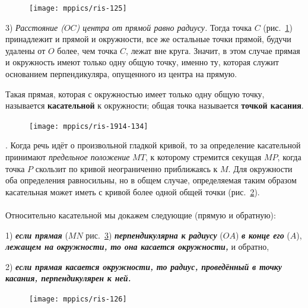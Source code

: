\documentclass[oneside]{book}
\makeatletter
\newcommand{\rindex}[2][\imki@jobname]{%
  \index[#1]{\detokenize{#2}}%
}
\makeatother
\begin{document}
\begin{figure}
\centering
\texttt{[image: mppics/ris-125]}
\caption{}\label{1938/ris-125}
\end{figure}

3) \emph{Расстояние \emph{($OC$)} центра от прямой равно радиусу.}
Тогда точка $C$ (рис.~\ref{1938/ris-125}) принадлежит и прямой и окружности, все же остальные точки прямой, будучи удалены от $O$ более, чем точка $C$, лежат вне круга.
Значит, в этом случае прямая и окружность имеют только одну общую точку, именно ту, которая служит основанием перпендикуляра, опущенного из центра на прямую.

Такая прямая, которая с окружностью имеет только одну общую точку, называется \rindex{касательная}\textbf{касательной} к окружности;
общая точка называется \rindex{точка касания}\textbf{точкой касания}.


\medskip

\begin{figure}
\centering
\texttt{[image: mppics/ris-1914-134]}
\caption{}\label{1914/ris-134}
\end{figure}

\smallskip
\mbox{.}
Когда речь идёт о произвольной гладкой кривой, то за определение касательной принимают \emph{предельное положение} $MT$, к которому стремится секущая $MP$, когда точка $P$ скользит по кривой неограниченно приближаясь к $M$.
Для окружности оба определения равносильны, но в общем случае, определяемая таким образом касательная может иметь с кривой более одной общей точки (рис.~\ref{1914/ris-134}).%

\paragraph{}\label{1938/113}
Относительно касательной мы докажем следующие  (прямую и обратную):

1) \textbf{\emph{если прямая}} ($MN$ рис.~\ref{1938/ris-126}) \textbf{\emph{перпендикулярна к радиусу}} ($OA$) \textbf{\emph{в конце его}} ($A$), \textbf{\emph{лежащем на окружности, то она касается окружности,}} и обратно,

2) \textbf{\emph{если прямая касается окружности, то радиус, проведённый в точку касания, перпендикулярен к ней.}}

\begin{figure}
\centering
\texttt{[image: mppics/ris-126]}
\caption{}\label{1938/ris-126}
\end{figure}
\end{document}
